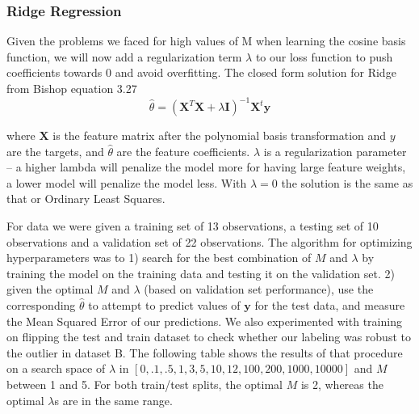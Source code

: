 \documentclass[10pt]{article}
\begin{document}
\subsubsection*{Ridge Regression}

Given the problems we faced for high values of M when learning the cosine basis function, we will now add a regularization term  $\lambda$ to our loss function to push coefficients towards 0 and avoid overfitting. 
The closed form solution for Ridge from Bishop equation 3.27
\begin{equation}
\hat{\theta} = (\mathbf{X}^T\mathbf{X} + \lambda \mathbf{I})^{-1}\mathbf{X}^t\mathbf{y}
\end{equation}

\noindent where $\mathbf{X}$ is the feature matrix after the polynomial basis transformation and  $y$ are the targets, and $\hat{\theta}$ are the feature coefficients. $\lambda$ is a regularization parameter --  a higher lambda will penalize the model more for having large feature weights, a lower model will penalize the model less. With $\lambda =0$ the solution is the same as that or Ordinary Least Squares.

For data we were given a training set of 13 observations, a testing set of 10 observations and a validation set of 22 observations. The algorithm for optimizing hyperparameters was to 1) search for the best combination of $M$ and $\lambda$ by training the model on the training data and testing it on the validation set. 2) given the optimal  $M$ and $\lambda$  (based on validation set performance), use the corresponding $\hat{\theta}$ to attempt to predict values of $\mathbf{y}$ for the test data, and measure the Mean Squared Error of our predictions. We also experimented with training on flipping the test and train dataset to check whether our labeling was robust to the outlier in dataset B. The following table shows the results of that procedure on a search space of  $\lambda$ in $[0, .1, .5, 1, 3,5,10, 12, 100, 200, 1000, 10000]$ and $M$  between 1 and 5. For both train/test splits, the optimal $M$ is 2, whereas the optimal $\lambda$s are in the same range. 
\end{document}
